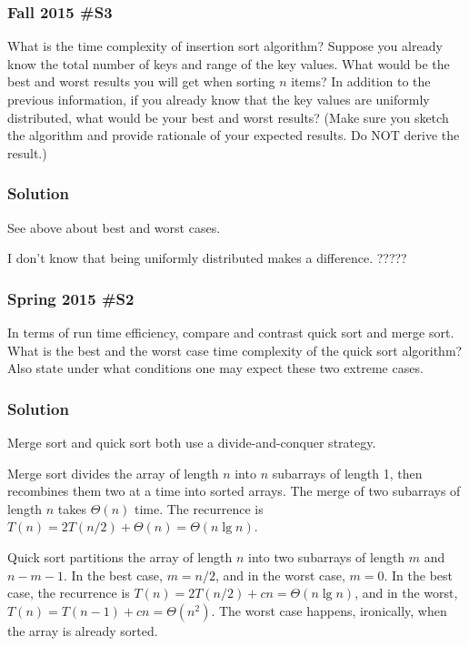 \subsubsection{Fall 2015 \#S3}

	What is the time complexity of insertion sort algorithm?  Suppose you already know the total number of keys and range of the key values.  What would be the best and worst results you will get when sorting $n$ items?  In addition to the previous information, if you already know that the key values are uniformly distributed, what would be your best and worst results?  (Make sure you sketch the algorithm and provide rationale of your expected results.  Do NOT derive the result.)

\subsubsection{Solution}

See above about best and worst cases.  

I don't know that being uniformly distributed makes a difference.  ?????

\subsubsection{Spring 2015 \#S2}
	
	In terms of run time efficiency, compare and contrast quick sort and merge sort.  What is the best and the worst case time complexity of the quick sort algorithm?  Also state under what conditions one may expect these two extreme cases.
	
\subsubsection{Solution}

Merge sort and quick sort both use a divide-and-conquer strategy.  

Merge sort divides the array of length $n$ into $n$ subarrays of length 1, then recombines them two at a time into sorted arrays.  The merge of two subarrays of length $n$ takes $\Theta(n)$ time.  The recurrence is $T(n) = 2T(n/2) + \Theta (n) = \Theta(n \lg n)$.

Quick sort partitions the array of length $n$ into two subarrays of length $m$ and $n-m-1$.  In the best case, $m = n/2$, and in the worst case, $m=0$.    In the best case, the recurrence is $T(n) = 2T(n/2) + cn = \Theta(n \lg n)$, and in the worst, $T(n) = T(n-1) + cn = \Theta(n^2)$.  The worst case happens, ironically, when the array is already sorted.  

